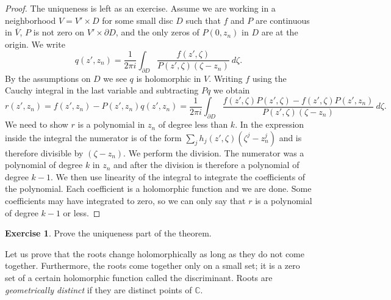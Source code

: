 \documentclass[12pt,openany]{book}
\newcommand{\C}{{\mathbb{C}}}
\newcommand{\myindex}[1]{#1\index{#1}}
\theoremstyle{plain}
\theoremstyle{remark}
\theoremstyle{definition}
\newenvironment{exbox}{%
    \def\FrameCommand{\vrule width 1pt \relax\hspace {10pt}}%
    \MakeFramed {\advance \hsize -\width \FrameRestore }%
}{%
    \endMakeFramed
}
\theoremstyle{exercise}
\newtheorem{exercise}{Exercise}[section]
\theoremstyle{example}
\begin{document}
\begin{proof}
The uniqueness is left as an exercise.  Assume we are working
in a neighborhood $V = V' \times D$ for some small disc $D$
such that $f$ and $P$ are continuous in $\overline{V}$,
$P$ is not zero on $V' \times \partial D$, and the
only zeros of $P(0,z_n)$ in $D$ are at the origin.  We write
\begin{equation*}
q(z',z_n) =
\frac{1}{2\pi i} \int_{\partial D} \frac{f(z',\zeta)}{P(z',\zeta)(\zeta-z_n)}
~d\zeta .
\end{equation*}
By the assumptions on $D$ we see $q$ is holomorphic in $V$. 
Writing $f$ using the Cauchy integral in the last variable and
subtracting $Pq$ we obtain
\begin{equation*}
r(z',z_n) = f(z',z_n) - P(z',z_n)q(z',z_n)
=
\frac{1}{2\pi i}
\int_{\partial D} \frac{f(z',\zeta)P(z',\zeta) - f(z',\zeta)P(z',z_n)}{P(z',\zeta)(\zeta-z_n)}
~d\zeta .
\end{equation*}
We need to show $r$ is a polynomial in $z_n$ of degree less than
$k$.  In the expression inside the integral the numerator is
of the form $\sum_j h_j(z',\zeta)(\zeta^j-z_n^j)$ and is therefore
divisible by $(\zeta-z_n)$.
We perform the division.  The numerator was a polynomial of degree $k$ in
$z_n$ and after the division is therefore a polynomial of degree $k-1$.
We then use linearity of the integral
to integrate the coefficients of the polynomial.  Each coefficient is a
holomorphic function and we are done.  Some coefficients may have
integrated to zero, so we can only say that $r$ is a polynomial
of degree $k-1$ or less.
\end{proof}

\begin{exbox}
\begin{exercise}
Prove the uniqueness part of the theorem.
\end{exercise}
\end{exbox}


Let us prove that the roots change holomorphically as long as they do not
come together.  Furthermore, the roots come together
only on a small set; it is a zero set of a certain holomorphic function
called the discriminant.  Roots are
\emph{\myindex{geometrically distinct}} if they are distinct
points of $\C$.
\end{document}
